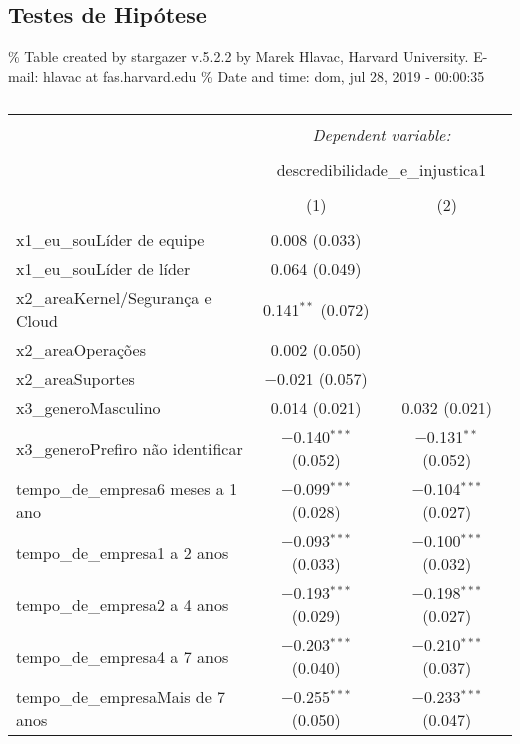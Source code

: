 \documentclass[]{book}
\begin{document}
\pagebreak

\hypertarget{testes-de-hipotese}{%
\subsection{Testes de Hipótese}\label{testes-de-hipotese}}

\% Table created by stargazer v.5.2.2 by Marek Hlavac, Harvard University. E-mail: hlavac at fas.harvard.edu
\% Date and time: dom, jul 28, 2019 - 00:00:35

\begin{table}[!htbp] \centering 
  \caption{} 
  \label{} 
\begin{tabular}{@{\extracolsep{5pt}}lcc} 
\\[-1.8ex]\hline 
\hline \\[-1.8ex] 
 & \multicolumn{2}{c}{\textit{Dependent variable:}} \\ 
\cline{2-3} 
\\[-1.8ex] & \multicolumn{2}{c}{descredibilidade\_e\_injustica1} \\ 
\\[-1.8ex] & (1) & (2)\\ 
\hline \\[-1.8ex] 
 x1\_eu\_souLíder de equipe & 0.008 (0.033) &  \\ 
  x1\_eu\_souLíder de líder & 0.064 (0.049) &  \\ 
  x2\_areaKernel/Segurança e Cloud & 0.141$^{**}$ (0.072) &  \\ 
  x2\_areaOperações & 0.002 (0.050) &  \\ 
  x2\_areaSuportes & $-$0.021 (0.057) &  \\ 
  x3\_generoMasculino & 0.014 (0.021) & 0.032 (0.021) \\ 
  x3\_generoPrefiro não identificar & $-$0.140$^{***}$ (0.052) & $-$0.131$^{**}$ (0.052) \\ 
  tempo\_de\_empresa6 meses a 1 ano & $-$0.099$^{***}$ (0.028) & $-$0.104$^{***}$ (0.027) \\ 
  tempo\_de\_empresa1 a 2 anos & $-$0.093$^{***}$ (0.033) & $-$0.100$^{***}$ (0.032) \\ 
  tempo\_de\_empresa2 a 4 anos & $-$0.193$^{***}$ (0.029) & $-$0.198$^{***}$ (0.027) \\ 
  tempo\_de\_empresa4 a 7 anos & $-$0.203$^{***}$ (0.040) & $-$0.210$^{***}$ (0.037) \\ 
  tempo\_de\_empresaMais de 7 anos & $-$0.255$^{***}$ (0.050) & $-$0.233$^{***}$ (0.047) \\ 

\end{tabular}
\end{table}
\end{document}
